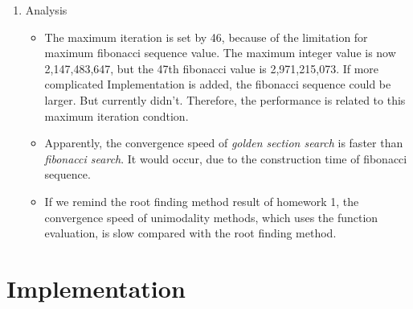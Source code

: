 \documentclass[12pt,letterpaper]{article}
\begin{document}
\begin{enumerate}
\item Analysis
\begin{itemize}
\item The maximum iteration is set by 46, because of the limitation for maximum fibonacci sequence value.
The maximum integer value is now 2,147,483,647, but the 47th fibonacci value is 2,971,215,073. 
If more complicated Implementation is added, the fibonacci sequence could be larger. But currently didn't.
Therefore, the performance is related to this maximum iteration condtion.
\item Apparently, the convergence speed of \emph{golden section search} is faster than \emph{fibonacci search}. 
It would occur, due to the construction time of fibonacci sequence.  
\item If we remind the root finding method result of homework 1, the convergence speed of unimodality methods, which uses the function evaluation, is slow compared with the root finding method.
\end{itemize}
\end{enumerate}

\newpage
\section*{Implementation}
\end{document}

